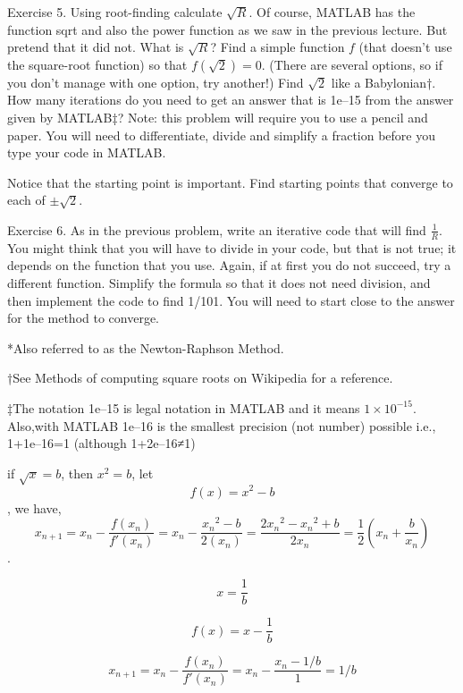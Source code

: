 \documentclass[a4paper,12pt]{article}
\begin{document}
Exercise 5. Using root-finding calculate \(\sqrt{R}\). Of course, MATLAB has the function sqrt and also the power function as we saw in the previous lecture. But pretend that it did not. What is \(\sqrt{R}\)? Find a simple function \(f\) (that doesn't use the square-root function) so that \(f(\sqrt{2})=0\). (There are several options, so if you don't manage with one option, try another!) Find \(\sqrt{2}\) like a Babylonian†. How many iterations do you need to get an answer that is 1e–15 from the answer given by MATLAB‡? Note: this problem will require you to use a pencil and paper. You will need to differentiate, divide and simplify a fraction before you type your code in MATLAB.

Notice that the starting point is important. Find starting points that converge to each of \(\pm\sqrt{2}\).

Exercise 6. As in the previous problem, write an iterative code that will find \(\frac{1}{R}\). You might think that you will have to divide in your code, but that is not true; it depends on the function that you use. Again, if at first you do not succeed, try a different function. Simplify the formula so that it does not need division, and then implement the code to find 1/101. You will need to start close to the answer for the method to converge.

*Also referred to as the Newton-Raphson Method.

†See Methods of computing square roots on Wikipedia for a reference.

‡The notation 1e–15 is legal notation in MATLAB and it means \(1\times10^{-15}\). Also,with MATLAB 1e–16 is the smallest precision (not number) possible i.e., 1+1e–16=1 (although 1+2e–16≠1)


if \(\sqrt{x}  = b\), then \({x^2} = b\),
let \[f(x) = {x^2} - b\], we have,
\[{x_{n + 1}} = {x_n} - \frac{{f({x_n})}}{{f'({x_n})}} = {x_n} - \frac{{{x_n}^2 - b}}{{2\left( {{x_n}} \right)}} = \frac{{2{x_n}^2 - {x_n}^2 + b}}{{2{x_n}}} = \frac{1}{2}\left( {{x_n} + \frac{b}{{{x_n}}}} \right)\].

\[x = \frac{1}{b}\]

\[f(x) = x - \frac{1}{b}\]

\[{x_{n + 1}} = {x_n} - \frac{{f({x_n})}}{{f'({x_n})}} = {x_n} - \frac{{{x_n} - 1/b}}{1} = 1/b\]
\end{document}
